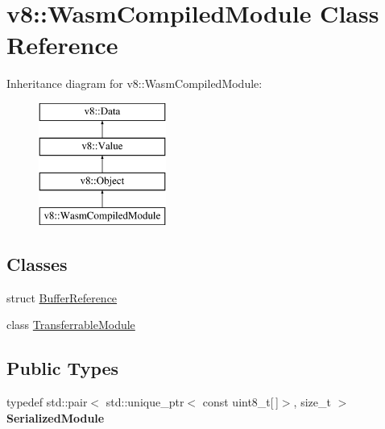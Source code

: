 \hypertarget{classv8_1_1WasmCompiledModule}{}\section{v8\+:\+:Wasm\+Compiled\+Module Class Reference}
\label{classv8_1_1WasmCompiledModule}
Inheritance diagram for v8\+:\+:Wasm\+Compiled\+Module\+:\begin{figure}[H]
\begin{center}
\leavevmode
\includegraphics[height=4.000000cm]{classv8_1_1WasmCompiledModule}
\end{center}
\end{figure}
\subsection*{Classes}
\begin{DoxyCompactItemize}
\item 
struct \mbox{\hyperlink{structv8_1_1WasmCompiledModule_1_1BufferReference}{Buffer\+Reference}}
\item 
class \mbox{\hyperlink{classv8_1_1WasmCompiledModule_1_1TransferrableModule}{Transferrable\+Module}}
\end{DoxyCompactItemize}
\subsection*{Public Types}
\begin{DoxyCompactItemize}
\item 
\mbox{\label{classv8_1_1WasmCompiledModule_af5ba87d6a6d78c06360c753001417f57}} 
typedef std\+::pair$<$ std\+::unique\+\_\+ptr$<$ const uint8\+\_\+t\mbox{[}$\,$\mbox{]}$>$, size\+\_\+t $>$ {\bfseries Serialized\+Module}
\end{DoxyCompactItemize}

